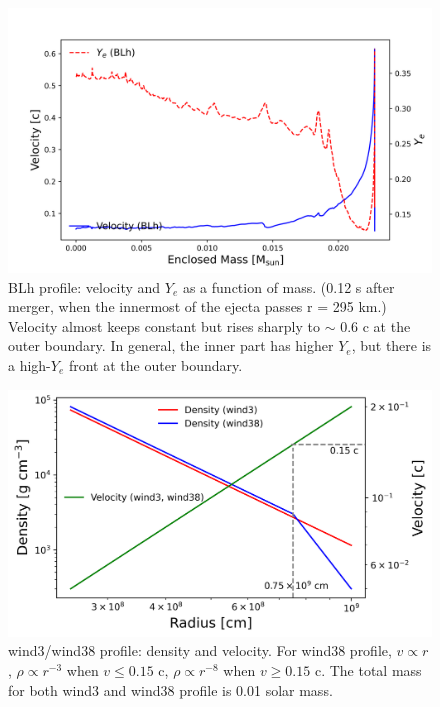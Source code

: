 \documentclass[fleqn,usenatbib]{mnras}
\begin{document}
    \begin{figure}
    \centering
    \includegraphics[scale=0.4]{figures/profiles/blh_vel_ye_mass.png}
    \caption{BLh profile: velocity and $Y_e$ as a function of mass. (0.12 s after merger, when the innermost of the ejecta passes r = 295 km.) Velocity almost keeps constant but rises sharply to $\sim$ 0.6 c at the outer boundary. In general, the inner part has higher $Y_e$, but there is a high-$Y_e$ front at the outer boundary.}
    \label{blh_profile}
    \end{figure}
    
        
    \begin{figure}
    \centering
    \includegraphics[scale=0.5]{figures/profiles/wind3_wind38_profile.png}
    \caption{wind3/wind38 profile: density and velocity. For wind38 profile, $v \propto r$, $\rho \propto r^{-3}$ when $v \le 0.15$ c, $\rho \propto r^{-8}$ when $v \ge 0.15$ c. The total mass for both wind3 and wind38 profile is 0.01 solar mass.}
    \label{wind3_wind38_profile}
    \end{figure}
    
\end{document}
